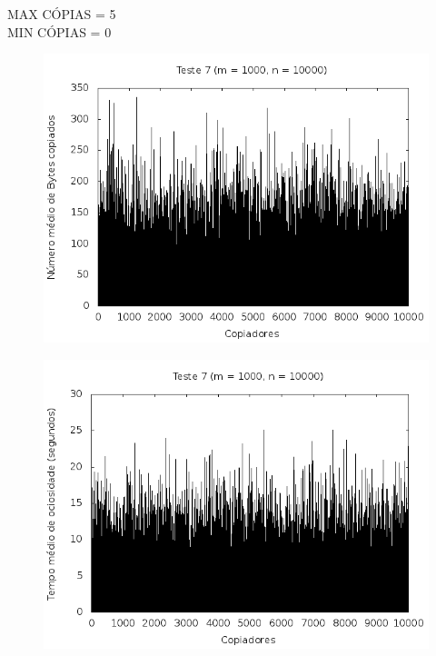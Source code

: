 \documentclass[12pt,a4paper]{article}
\begin{document}
MAX CÓPIAS = 5
\\
MIN CÓPIAS = 0

\begin{center}
\begin{figure}[H]
    \center
    \includegraphics[scale=0.5]{imagens/grafico_bytes7.png}
    \label{teste7_bytes}
\end{figure}
\end{center}

\begin{center}
\begin{figure}[H]
    \center
    \includegraphics[scale=0.5]{imagens/grafico_ociosidade7.png}
    \label{teste7_ociosidade}
\end{figure}
\end{center}
\end{document}
